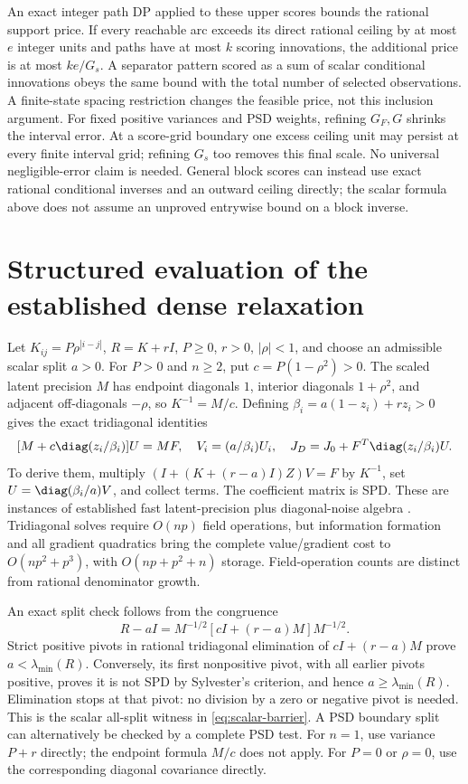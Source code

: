 An exact integer path DP applied to these upper scores bounds the rational
support price. If every reachable arc exceeds its direct rational ceiling
by at most $e$ integer units and paths have at most $k$ scoring innovations,
the additional price is at most $ke/G_s$. A separator pattern scored as a
sum of scalar conditional innovations obeys the same bound with the total
number of selected observations. A finite-state spacing restriction changes
the feasible price, not this inclusion argument. For fixed positive variances
and PSD weights, refining $G_F,G$ shrinks the interval error. At a score-grid
boundary one excess ceiling unit may persist at every finite interval grid;
refining $G_s$ too removes this final scale. No universal negligible-error
claim is needed. General block scores can instead use exact rational
conditional inverses and an outward ceiling directly; the scalar formula
above does not assume an unproved entrywise bound on a block inverse.

\section{Structured evaluation of the established dense relaxation}
\label{app:dense-oracle}

Let $K_{ij}=P\rho^{|i-j|}$, $R=K+rI$, $P\ge0$, $r>0$,
$|\rho|<1$, and choose an admissible scalar split $a>0$.
For $P>0$ and $n\ge2$, put $c=P(1-\rho^2)>0$. The scaled latent precision
$M$ has endpoint diagonals $1$, interior diagonals $1+\rho^2$, and adjacent
off-diagonals $-\rho$, so $K^{-1}=M/c$. Defining
$\beta_i=a(1-z_i)+rz_i>0$ gives the exact tridiagonal identities
\begin{equation}\label{eq:dense-tridiagonal}
 [M+c\diag(z_i/\beta_i)]U=MF,\quad
 V_i=(a/\beta_i)U_i,\quad
 J_D=J_0+F^T\diag(z_i/\beta_i)U.
\end{equation}
To derive them, multiply $(I+(K+(r-a)I)Z)V=F$ by $K^{-1}$,
set $U=\diag(\beta_i/a)V$, and collect terms. The coefficient matrix
is SPD. These are instances of established fast latent-precision plus
diagonal-noise algebra \citep{RybickiPress1995}. Tridiagonal solves require
$O(np)$ field operations, but information formation and all gradient
quadratics bring the complete value/gradient cost to $O(np^2+p^3)$,
with $O(np+p^2+n)$ storage. Field-operation counts are distinct from
rational denominator growth.

An exact split check follows from the congruence
\begin{equation}\label{eq:split-tridiagonal-check}
 R-aI=M^{-1/2}[cI+(r-a)M]M^{-1/2}.
\end{equation}
Strict positive pivots in rational tridiagonal elimination of
$cI+(r-a)M$ prove $a<\lambda_{\min}(R)$. Conversely, its first nonpositive
pivot, with all earlier pivots positive, proves it is not SPD by Sylvester's
criterion, and hence $a\ge\lambda_{\min}(R)$. Elimination stops at that
pivot: no division by a zero or negative pivot is needed. This is the scalar
all-split witness in \eqref{eq:scalar-barrier}. A PSD boundary split can
alternatively be checked by a complete PSD test. For $n=1$, use variance
$P+r$ directly; the endpoint formula $M/c$ does not apply. For $P=0$ or
$\rho=0$, use the corresponding diagonal covariance directly.

